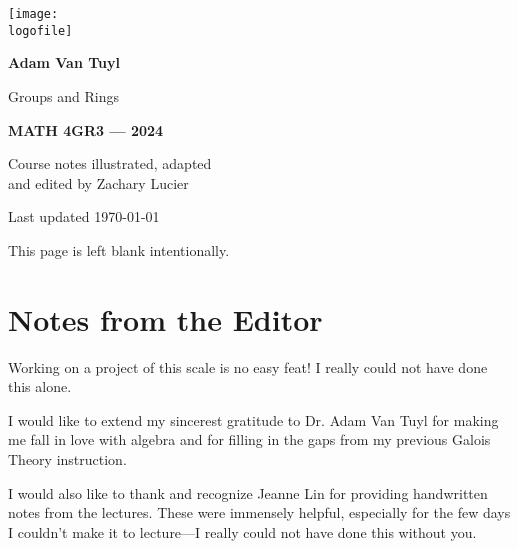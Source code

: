 \documentclass{bookneue}
\begin{document}


\frontmatter

\begin{titlepage}
	\raggedleft

	\vspace*{16pt}

	\texttt{[image: \\logofile]}
    
    \vspace*{80pt}
    
    {\color{main}\sffamily\bfseries\Huge\selectfont Adam Van Tuyl\par}\vspace{12pt}
    
    {\TitleFont\fontsize{60pt}{60pt}\selectfont Groups and Rings\par}\vspace{24pt}

    {\sffamily\bfseries\LARGE MATH 4GR3 — 2024\par}

    {\sffamily\Large Course notes illustrated, adapted\\ and edited by Zachary Lucier\par}

    \vspace*{0.167\textheight}

    {\sffamily Last updated \today\par}
\end{titlepage}

\thispagestyle{empty}
\begin{center}
	This page is left blank intentionally.
\end{center}

\chapter*{Notes from the Editor}

Working on a project of this scale is no easy feat! I really could not have done this alone.

I would like to extend my sincerest gratitude to Dr. Adam Van Tuyl for making me fall in love with algebra and for filling in the gaps from my previous Galois Theory instruction.

I would also like to thank and recognize Jeanne Lin for providing handwritten notes from the lectures. These were immensely helpful, especially for the few days I couldn't make it to lecture—I really could not have done this without you.
\end{document}
